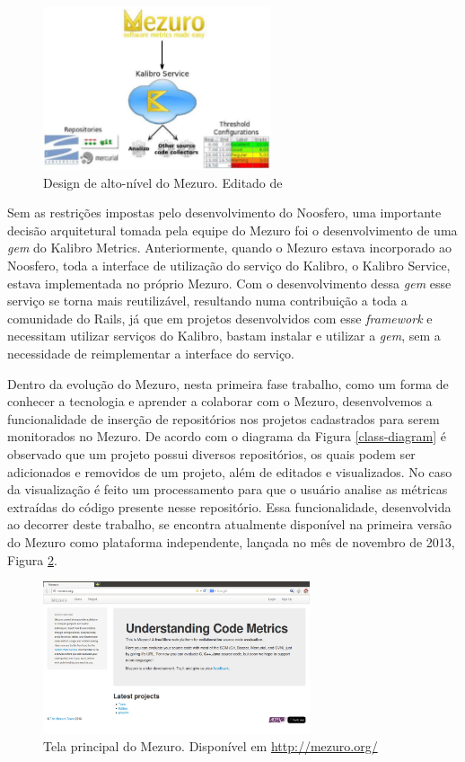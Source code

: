 \graphicspath{{figuras/}}
\begin{figure}[H]
\centering
\includegraphics[width=0.6\textwidth]{mezuro-standalone-design}
\caption{Design de alto-nível do Mezuro. Editado de \cite{meirelles2010mezuro}}
\label{mezuro-design}
\end{figure}

Sem as restrições impostas pelo desenvolvimento do Noosfero, uma importante decisão arquitetural tomada pela equipe do Mezuro foi o desenvolvimento de uma \textit{gem} do Kalibro Metrics. Anteriormente, quando o Mezuro estava incorporado ao Noosfero, toda a interface de utilização do serviço do Kalibro, o Kalibro Service, estava implementada no próprio Mezuro. Com o desenvolvimento dessa \textit{gem} esse serviço se torna mais reutilizável, resultando numa contribuição a toda a comunidade do Rails, já que em projetos desenvolvidos com esse \textit{framework} e necessitam utilizar serviços do Kalibro, bastam instalar e utilizar a \textit{gem}, sem a necessidade de reimplementar a interface do serviço.

Dentro da evolução do Mezuro, nesta primeira fase trabalho, como um forma de conhecer a tecnologia e aprender a colaborar com o Mezuro, desenvolvemos a funcionalidade de inserção de repositórios nos projetos cadastrados para serem monitorados no Mezuro. De acordo com o diagrama da Figura \ref{class-diagram} é observado que um projeto possui diversos repositórios, os quais podem ser adicionados e removidos de um projeto, além de editados e visualizados. No caso da visualização é feito um processamento para que o usuário analise as métricas extraídas do código presente nesse repositório. 
%
Essa funcionalidade, desenvolvida ao decorrer deste trabalho, se encontra atualmente disponível na primeira versão do Mezuro como plataforma independente, lançada no mês de novembro de 2013, Figura \ref{mezuro}.

\graphicspath{{figuras/}}
\begin{figure}[H]
\centering
\includegraphics[width=0.7\textwidth]{mezuro-standalone}
\caption{Tela principal do Mezuro. Disponível em \url{http://mezuro.org/}}
\label{mezuro}
\end{figure}

